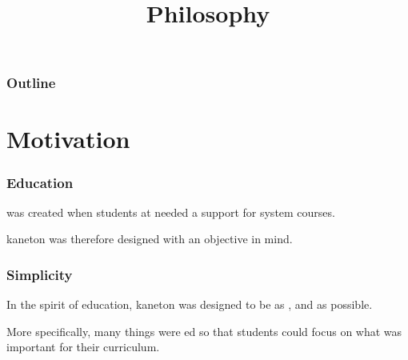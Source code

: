 %
%
%
%
%
%

%
%

%
%

\def\path{../..}

%
%



%
%

\title{Philosophy}

%
%



%
%

\begin{frame}
  \titlepage
\end{frame}

%
%

\begin{frame}
  \frametitle{Outline}

  \tableofcontents
\end{frame}

%
%

\section{Motivation}


\begin{frame}
  \frametitle{Education}

   was created when students at  needed a support
  for system courses.

  \-

  kaneton was therefore designed with an  objective in mind.
\end{frame}


\begin{frame}
  \frametitle{Simplicity}

  In the spirit of education, kaneton was designed to be as ,
   and  as possible.

  \-

  More specifically, many things were ed so that students
  could focus on what was important for their curriculum.
\end{frame}

